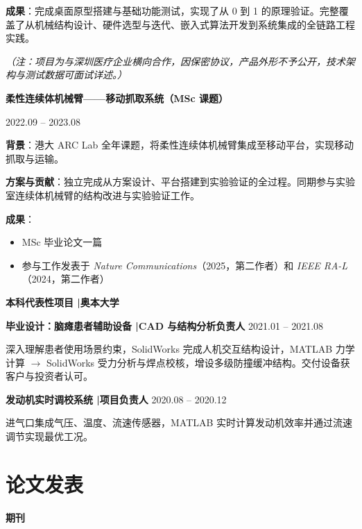 \documentclass[11pt,a4paper]{article}
\newcommand{\cvdate}[1]{\hfill\textcolor{midgray}{\small #1}}
\newcommand{\projectsection}[1]{\vspace{0.25em}\textbf{#1}\par\vspace{0.03em}}
\newcommand{\projectlabel}[1]{\textbf{\small #1}：}
\begin{document}
{\projectlabel{成果}完成桌面原型搭建与基础功能测试，实现了从 0 到 1 的原理验证。完整覆盖了从机械结构设计、硬件选型与迭代、嵌入式算法开发到系统集成的全链路工程实践。}

{\small\textit{（注：项目为与深圳医疗企业横向合作，因保密协议，产品外形不予公开，技术架构与测试数据可面试详述。）}}


\projectsection{柔性连续体机械臂——移动抓取系统（MSc 课题）} \cvdate{2022.09 -- 2023.08}

{\projectlabel{背景}港大 ARC Lab 全年课题，将柔性连续体机械臂集成至移动平台，实现移动抓取与运输。}

{\projectlabel{方案与贡献}独立完成从方案设计、平台搭建到实验验证的全过程。同期参与实验室连续体机械臂的结构改进与实验验证工作。}

{\projectlabel{成果}
\begin{itemize}
  \item MSc 毕业论文一篇
  \item 参与工作发表于 \textit{Nature Communications}（2025，第二作者）和 \textit{IEEE RA-L}（2024，第二作者）
\end{itemize}}


\projectsection{本科代表性项目 \quad|\quad 奥本大学}

\textbf{毕业设计：脑瘫患者辅助设备 \quad|\quad CAD 与结构分析负责人} \cvdate{2021.01 -- 2021.08}

{\small 深入理解患者使用场景约束，SolidWorks 完成人机交互结构设计，MATLAB 力学计算 $\rightarrow$ SolidWorks 受力分析与焊点校核，增设多级防撞缓冲结构。交付设备获客户与投资者认可。}

\vspace{0.12em}
\textbf{发动机实时调校系统 \quad|\quad 项目负责人} \cvdate{2020.08 -- 2020.12}

{\small 进气口集成气压、温度、流速传感器，MATLAB 实时计算发动机效率并通过流速调节实现最优工况。}

\section{论文发表}

{\sffamily\bfseries\small 期刊}
\end{document}

